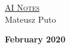 \thispagestyle{empty}
\begin{center}
\vspace*{3cm}

\noindent \Huge \textsc{\underline{AI Notes}} \\
\vspace*{0.8cm}
\noindent \Huge Mateusz Puto\\
\vspace*{1.9cm}

\end{center}
\vfill
\begin{center}
\Large\textbf{{February 2020}}
\end{center}
\newpage